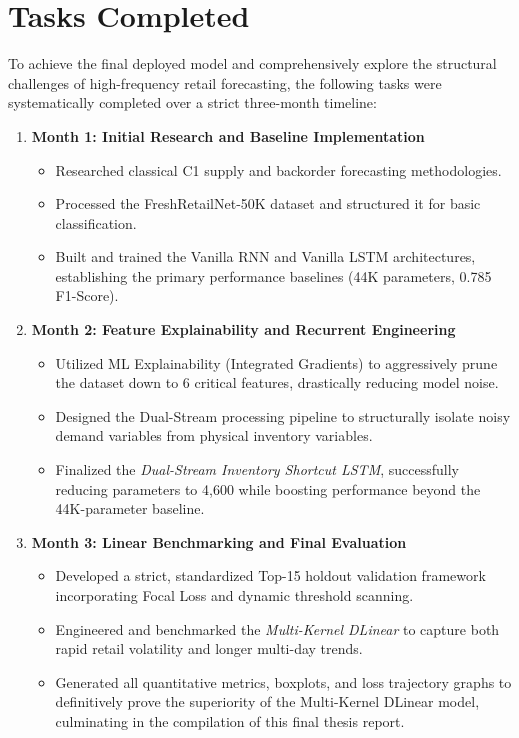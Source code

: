 \chapter{Tasks Completed}
\label{chap:tasks}

To achieve the final deployed model and comprehensively explore the structural challenges of high-frequency retail forecasting, the following tasks were systematically completed over a strict three-month timeline:

\begin{enumerate}
    \item \textbf{Month 1: Initial Research and Baseline Implementation} 
    
    \begin{itemize}
        \item Researched classical C1 supply and backorder forecasting methodologies.
        \item Processed the FreshRetailNet-50K dataset and structured it for basic classification.
        \item Built and trained the Vanilla RNN and Vanilla LSTM architectures, establishing the primary performance baselines (44K parameters, 0.785 F1-Score).
    \end{itemize}
    
    \item \textbf{Month 2: Feature Explainability and Recurrent Engineering}
    
    \begin{itemize}
        \item Utilized ML Explainability (Integrated Gradients) to aggressively prune the dataset down to 6 critical features, drastically reducing model noise.
        \item Designed the Dual-Stream processing pipeline to structurally isolate noisy demand variables from physical inventory variables.
        \item Finalized the \textit{Dual-Stream Inventory Shortcut LSTM}, successfully reducing parameters to 4,600 while boosting performance beyond the 44K-parameter baseline.
    \end{itemize}
    
    \item \textbf{Month 3: Linear Benchmarking and Final Evaluation}
    
    \begin{itemize}
        \item Developed a strict, standardized Top-15 holdout validation framework incorporating Focal Loss and dynamic threshold scanning.
        \item Engineered and benchmarked the \textit{Multi-Kernel DLinear} to capture both rapid retail volatility and longer multi-day trends.
        \item Generated all quantitative metrics, boxplots, and loss trajectory graphs to definitively prove the superiority of the Multi-Kernel DLinear model, culminating in the compilation of this final thesis report.
    \end{itemize}
\end{enumerate}
